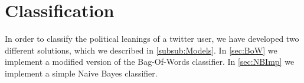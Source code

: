 \chapter{Classification}

In order to classify the political leanings of a twitter user, we have
developed two different solutions, which we described in
\autoref{subsub:Models}. In \autoref{sec:BoW} we implement a modified version of
the Bag-Of-Words classifier. In \autoref{sec:NBImp} we implement a simple Naive
Bayes classifier.
